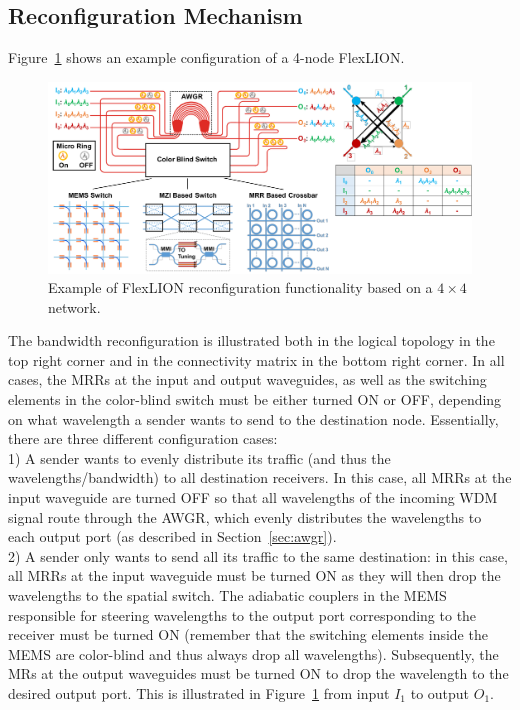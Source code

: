 \subsection{Reconfiguration Mechanism}
Figure~\ref{fig:reconfexample} shows an example configuration of a 4-node FlexLION. 
\begin{figure}[t!]
        \includegraphics[width=\textwidth, clip]{Figures/reconf_example.pdf}
        \caption{Example of FlexLION reconfiguration functionality based on a $4\times4$ network.}
        		\label{fig:reconfexample}
\end{figure}
The bandwidth reconfiguration is illustrated both in the logical topology in the top right corner and in the connectivity matrix in the bottom right corner. In all cases, the MRRs at the input and output waveguides, as well as the switching elements in the color-blind switch must be either turned ON or OFF, depending on what wavelength a sender wants to send to the destination node. Essentially, there are three different configuration cases: \\
1) A sender wants to evenly distribute its traffic (and thus the wavelengths/bandwidth) to all destination receivers. In this case, all MRRs at the input waveguide are turned OFF so that all wavelengths of the incoming WDM signal route through the AWGR, which evenly distributes the wavelengths to each output port (as described in Section~\ref{sec:awgr}). \\
2) A sender only wants to send all its traffic to the same destination: in this case, all MRRs at the input waveguide must be turned ON as they will then drop the wavelengths to the spatial switch. The adiabatic couplers in the MEMS responsible for steering wavelengths to the output port corresponding to the receiver must be turned ON (remember that the switching elements inside the MEMS are color-blind and thus always drop all wavelengths). Subsequently, the MRs at the output waveguides must be turned ON to drop the wavelength to the desired output port. This is illustrated in Figure~\ref{fig:reconfexample} from input $I_1$ to output $O_1$.  \\
